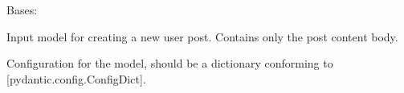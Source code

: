 \documentclass[letterpaper,10pt,openany,oneside,english]{sphinxmanual}
\begin{document}
\begin{savenotes}
\begin{fulllineitems}
\begin{savenotes}
\begin{fulllineitems}
\end{fulllineitems}\end{savenotes}



\begin{savenotes}\begin{fulllineitems}

\pysigstartsignatures
{}
\pysigstopsignatures
\end{fulllineitems}\end{savenotes}


\end{fulllineitems}\end{savenotes}



\begin{savenotes}\begin{fulllineitems}

\pysigstartsignatures
{}
\pysigstopsignatures
\sphinxAtStartPar
Bases: 

\sphinxAtStartPar
Input model for creating a new user post.
Contains only the post content body.


\begin{savenotes}\begin{fulllineitems}

\pysigstartsignatures
{}
\pysigstopsignatures
\end{fulllineitems}\end{savenotes}



\begin{savenotes}\begin{fulllineitems}

\pysigstartsignatures
{}
\pysigstopsignatures
\sphinxAtStartPar
Configuration for the model, should be a dictionary conforming to {[}\sphinxtitleref{ConfigDict}{]}{[}pydantic.config.ConfigDict{]}.

\end{fulllineitems}\end{savenotes}


\end{fulllineitems}\end{savenotes}
\end{document}
